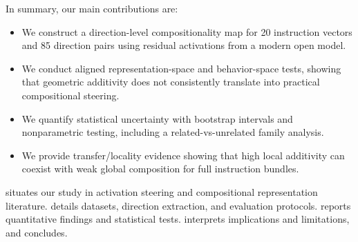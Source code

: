 In summary, our main contributions are:
\begin{itemize}[leftmargin=*,itemsep=0pt,topsep=0pt]
    \item We construct a direction-level compositionality map for 20 instruction vectors and 85 direction pairs using residual activations from a modern open model.
    \item We conduct aligned representation-space and behavior-space tests, showing that geometric additivity does not consistently translate into practical compositional steering.
    \item We quantify statistical uncertainty with bootstrap intervals and nonparametric testing, including a related-vs-unrelated family analysis.
    \item We provide transfer/locality evidence showing that high local additivity can coexist with weak global composition for full instruction bundles.
\end{itemize}

  situates our study in activation steering and compositional representation literature.  details datasets, direction extraction, and evaluation protocols.  reports quantitative findings and statistical tests.  interprets implications and limitations, and  concludes.
